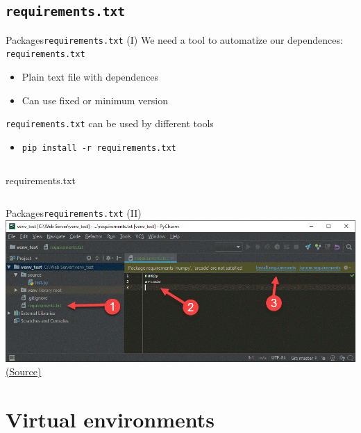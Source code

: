 \documentclass[10pt,compress]{beamer} %
\begin{document}
\subsection{\texttt{requirements.txt}}

\begin{frame}[fragile]{Packages}{\texttt{requirements.txt} (I)}
	We need a tool to automatize our dependences: \texttt{requirements.txt}
		\begin{itemize}
		\item Plain text file with dependences
		\item Can use fixed or minimum version
		\end{itemize}
	\texttt{requirements.txt} can be used by different tools
		\begin{itemize}
		\item \texttt{pip install -r requirements.txt}
		\end{itemize}


	\begin{columns}
	\begin{exampleblock}{requirements.txt}
	\vspace{-0.2cm}
	
	\vspace{-0.2cm}
	\end{exampleblock}
    \end{columns}
\end{frame}

\begin{frame}[fragile]{Packages}{\texttt{requirements.txt} (II)}
    \centering
	\includegraphics[width=0.7\linewidth]{figs/requirements}\\
    \centering \tiny{\href{https://github.com/pythonarcade/arcade/blob/development/doc/get_started/install/images/requirements.png}{(Source)}}
\end{frame}



\section{Virtual environments}
\end{document}
